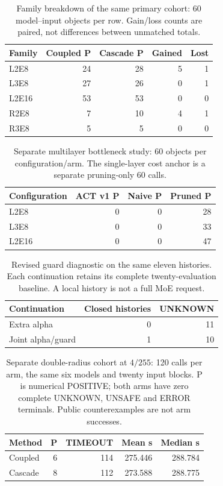 \begin{table}[ht]
\centering\small
\caption{Family breakdown of the same primary cohort: 60 model--input objects per row. Gain/loss counts are paired, not differences between unmatched totals.}
\label{tab:families}
\begin{tabular}{lrrrr}
\toprule
Family & Coupled P & Cascade P & Gained & Lost \\
\midrule
L2E8 & 24 & 28 & 5 & 1 \\
L3E8 & 27 & 26 & 0 & 1 \\
L2E16 & 53 & 53 & 0 & 0 \\
R2E8 & 7 & 10 & 4 & 1 \\
R3E8 & 5 & 5 & 0 & 0 \\
\bottomrule
\end{tabular}
\end{table}

\begin{table}[ht]
\centering\small
\caption{Separate multilayer bottleneck study: 60 objects per configuration/arm. The single-layer cost anchor is a separate pruning-only 60 calls.}
\label{tab:multilayer}
\begin{tabular}{lrrr}
\toprule
Configuration & ACT v1 P & Naive P & Pruned P \\
\midrule
L2E8 & 0 & 0 & 28 \\
L3E8 & 0 & 0 & 33 \\
L2E16 & 0 & 0 & 47 \\
\bottomrule
\end{tabular}
\end{table}

\begin{table}[ht]
\centering\small
\caption{Revised guard diagnostic on the same eleven histories. Each continuation retains its complete twenty-evaluation baseline. A local history is not a full MoE request.}
\label{tab:guard}
\begin{tabular}{lrr}
\toprule
Continuation & Closed histories & UNKNOWN \\
\midrule
Extra alpha & 0 & 11 \\
Joint alpha/guard & 1 & 10 \\
\bottomrule
\end{tabular}
\end{table}

\begin{table}[ht]
\centering\small
\caption{Separate double-radius cohort at $4/255$: 120 calls per arm, the same six models and twenty input blocks. P is numerical POSITIVE; both arms have zero complete UNKNOWN, UNSAFE and ERROR terminals. Public counterexamples are not arm successes.}
\label{tab:radius}
\begin{tabular}{lrrrr}
\toprule
Method & P & TIMEOUT & Mean s & Median s \\
\midrule
Coupled & 6 & 114 & 275.446 & 288.784 \\
Cascade & 8 & 112 & 273.588 & 288.775 \\
\bottomrule
\end{tabular}
\end{table}

